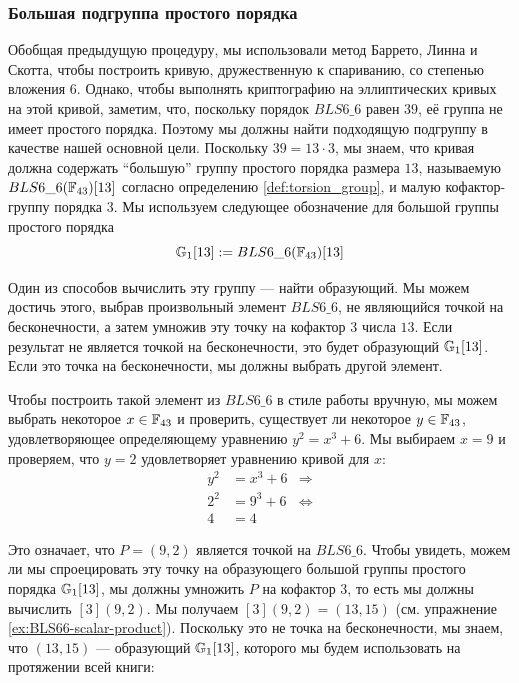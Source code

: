 \subsubsection{Большая подгруппа простого порядка}
Обобщая предыдущую процедуру, мы использовали метод Баррето, Линна и Скотта, чтобы построить кривую, дружественную к спариванию, со степенью вложения $6$. Однако, чтобы выполнять криптографию на эллиптических кривых на этой кривой, заметим, что, поскольку порядок $BLS6\_6$ равен $39$, её группа не имеет простого порядка. Поэтому мы должны найти подходящую подгруппу в качестве нашей основной цели. Поскольку $39=13\cdot 3$, мы знаем, что кривая должна содержать ``большую'' группу простого порядка размера $13$, называемую $BLS6\_6(\mathbb{F}_{43})[13]$ согласно определению \ref{def:torsion_group}, и малую кофактор-группу порядка $3$. Мы используем следующее обозначение для большой группы простого порядка
\begin{equation}
\label{def:BLS6613}
\mathbb{G}_1[13]:= BLS6\_6(\mathbb{F}_{43})[13]
\end{equation}

Один из способов вычислить эту группу — найти образующий. Мы можем достичь этого, выбрав произвольный элемент $BLS6\_6$, не являющийся точкой на бесконечности, а затем умножив эту точку на кофактор $3$ числа $13$. Если результат не является точкой на бесконечности, это будет образующий $\mathbb{G}_1[13]$. Если это точка на бесконечности, мы должны выбрать другой элемент. 

Чтобы построить такой элемент из $BLS6\_6$ в стиле работы вручную, мы можем выбрать некоторое $x\in\mathbb{F}_{43}$ и проверить, существует ли некоторое $y\in\mathbb{F}_{43}$, удовлетворяющее определяющему уравнению  $y^2 = x^3 + 6$. Мы выбираем $x=9$ и проверяем, что $y=2$ удовлетворяет уравнению кривой для $x$:
\begin{align*}
y^2 & = x^3 + 6 & \Rightarrow \\
2^2 & = 9^3 + 6 & \Leftrightarrow \\
4 & = 4
\end{align*}   

Это означает, что $P=(9,2)$ является точкой на $BLS6\_6$. Чтобы увидеть, можем ли мы спроецировать эту точку на образующего большой группы простого порядка $\mathbb{G}_1[13]$, мы должны умножить $P$ на кофактор $3$, то есть мы должны вычислить $[3](9,2)$. Мы получаем $[3](9,2) = (13,15)$ (см. упражнение \ref{ex:BLS66-scalar-product}). Поскольку это не точка на бесконечности, мы знаем, что $(13,15)$ — образующий $\mathbb{G}_1[13]$, которого мы будем использовать на протяжении всей книги: 

